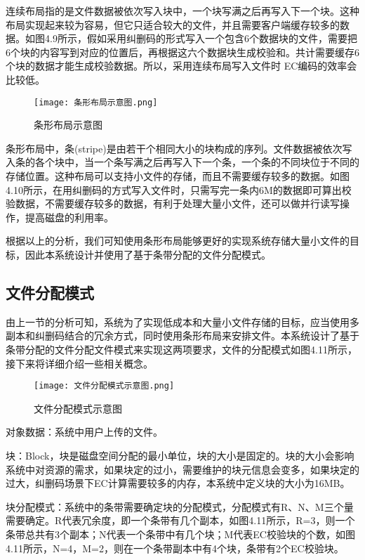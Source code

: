 连续布局指的是文件数据被依次写入块中，一个块写满之后再写入下一个块。这种布局实现起来较为容易，但它只适合较大的文件，并且需要客户端缓存较多的数据。如图4.9所示，假如采用纠删码的形式写入一个包含6个数据块的文件，需要把6个块的内容写到对应的位置后，再根据这六个数据块生成校验和。共计需要缓存6个块的数据才能生成校验数据。所以，采用连续布局写入文件时 EC编码的效率会比较低。

\begin{figure}[h]
  \centering
  \texttt{[image: 条形布局示意图.png]}
  \caption{条形布局示意图}
\end{figure}

条形布局中，条(stripe)是由若干个相同大小的块构成的序列。文件数据被依次写入条的各个块中，当一个条写满之后再写入下一个条，一个条的不同块位于不同的存储位置。这种布局可以支持小文件的存储，而且不需要缓存较多的数据。如图4.10所示，在用纠删码的方式写入文件时，只需写完一条内6M的数据即可算出校验数据，不需要缓存较多的数据，有利于处理大量小文件，还可以做并行读写操作，提高磁盘的利用率。

根据以上的分析，我们可知使用条形布局能够更好的实现系统存储大量小文件的目标，因此本系统设计并使用了基于条带分配的文件分配模式。

\subsection{文件分配模式}%
由上一节的分析可知，系统为了实现低成本和大量小文件存储的目标，应当使用多副本和纠删码结合的冗余方式，同时使用条形布局来安排文件。本系统设计了基于条带分配的文件分配文件模式来实现这两项要求，文件的分配模式如图4.11所示，接下来将详细介绍一些相关概念。

\begin{figure}[h]
    \centering
    \texttt{[image: 文件分配模式示意图.png]}
    \caption{文件分配模式示意图}
  \end{figure}

对象数据：系统中用户上传的文件。

块：Block，块是磁盘空间分配的最小单位，块的大小是固定的。块的大小会影响系统中对资源的需求，如果块定的过小，需要维护的块元信息会变多，如果块定的过大，纠删码场景下EC计算需要较多的内存，本系统中定义块的大小为16MB。

块分配模式：系统中的条带需要确定块的分配模式，分配模式有R、N、M三个量需要确定。R代表冗余度，即一个条带有几个副本，如图4.11所示，R=3，则一个条带总共有3个副本；N代表一个条带中有几个块；M代表EC校验块的个数，如图4.11所示，N=4，M=2，则在一个条带副本中有4个块，条带有2个EC校验块。

